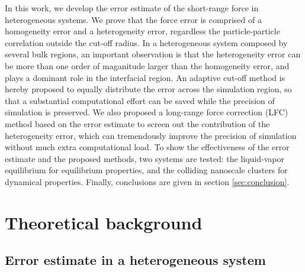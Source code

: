 \documentclass[aps,pre,preprint]{revtex4-1}
\begin{document}
In this work, we develop the error estimate of the short-range force
in heterogeneous systems. We prove that the 
force error is comprised of a homogeneity error and a heterogeneity
error, regardless the particle-particle correlation outside the
cut-off radius.  In a heterogeneous system composed by several bulk
regions, an important observation is that the heterogeneity error can
be more than one order of maganitude larger than the homogeneity
error, and plays a dominant role in the interfacial region. An
adaptive cut-off method is hereby proposed to equally distribute the
error across the simulation region, so that a substantial
computational effort can be saved while the precision of simulation is
preserved. We also proposed a long-range force correction (LFC) method
based on the error estimate to screen out the contribution of the
heterogeneity error, which can tremendously improve the precision of
simulation without much extra computational load. To show the
effectiveness of the error estimate and the proposed methods, two
systems are tested: the liquid-vapor equilibrium for equilibrium
properties, and the colliding nanoscale clusters for dynamical
properties. Finally, conclusions are given in section
\ref{sec:conclusion}.




\section{Theoretical background}
\subsection{Error estimate in a heterogeneous system}
\end{document}
